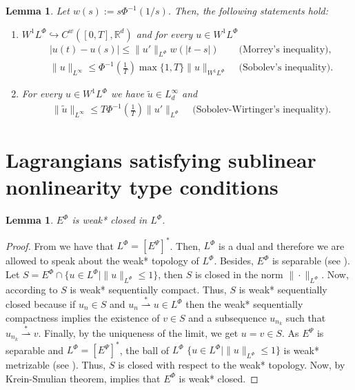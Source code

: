 \documentclass[twoside]{article}
\newtheorem{lem}[thm]{Lemma}
\theoremstyle{remark}
\newcommand{\orlnor}{\|_{L^{\Phi}}}
\newcommand{\lphi}{L^{\Phi}}
\newcommand{\ephi}{E^{\Phi}}
\newcommand{\wphi}{W^{1}\lphi}
\newcommand{\sobnor}{\|_{W^{1}\lphi}}
\newcommand{\rr}{\mathbb{R}}
\renewcommand{\leq}{\leqslant}
\newcommand{\epsi}{E^{\Psi}}
\begin{document}
\begin{lem}\label{inclusion orlicz} Let  $w(s):= s\Phi^{-1}(1/s)$. Then, the following statements hold:
\begin{enumerate}
\item\label{inclusion orlicz_item1} $\wphi\hookrightarrow C^w([0,T],\rr^d) $ and for every $u\in\wphi$
\begin{align}
 &\left|u(t)-u(s) \right| \leq  \|u'\orlnor w(| t-s|)&\text{  (Morrey's inequality),}\label{in-sob-cont}
\\
& \|u\|_{L^{\infty}} \leq\Phi^{-1}\left(\frac{1}{T}\right)\max\{1,T\}\|u\sobnor&\text{  (Sobolev's inequality).}\label{sobolev}
\end{align}
\item For every $u\in\wphi$ we have $\widetilde{u}\in L^{\infty}_d$ and
\begin{align}
& \|\widetilde{u}\|_{L^{\infty}} \leq T\Phi^{-1}\left(\frac{1}{T}\right)\|u'\orlnor&
\text{  (Sobolev-Wirtinger's inequality).}\label{wirtinger}
\end{align}




\end{enumerate}
\end{lem}






\section{Lagrangians satisfying  sublinear nonlinearity type conditions}



\begin{lem}\label{lem:deb*cerrado}
$\ephi$ is weak* closed in $\lphi$.
\end{lem}


\begin{proof}
From \cite[Thm. 7, p. 110]{rao1991theory} we have that $\lphi=\left[\epsi\right]^*
$.
Then, $\lphi$ is a dual and therefore we are allowed to speak about the weak* topology of $\lphi$.
Besides, $\ephi
$ is separable (see \cite[Thm. 1, p. 87]{rao1991theory}).
Let $S=\ephi\cap \{u \in \lphi|\|u\orlnor\leq 1\}$, then $S$ is closed in the norm $\|\cdot\orlnor$. 
Now, according to \cite[Cor. 5, p. 148]{rao1991theory} $S$ is weak* sequentially compact. 
Thus, $S$ is weak* sequentially closed because if $u_n\in S$ and
$u_n \overset{*}{\rightharpoonup}u \in \lphi$ then  the weak* sequentially compactness implies the existence of $v \in S$ and a subsequence $u_{n_k}$ such that
$u_{n_k}\overset{*}{\rightharpoonup}v$. Finally, by the uniqueness of   the limit, we get
$u=v\in S$.
As $\epsi$ is separable and $\lphi=\left[\epsi\right]^*$, the ball of $\lphi$ $\{u \in \lphi | \|u\orlnor\leq 1\}$ is  weak* metrizable (see \cite[Thm. 5.1, p. 138]{Conway1977}).
Thus, $S$ is closed with respect to  the weak* topology. Now, by  Krein-Smulian theorem, \cite[Cor. 12.6, p. 165]{Conway1977} implies that $\ephi$ is weak* closed.
\end{proof}
\end{document}
